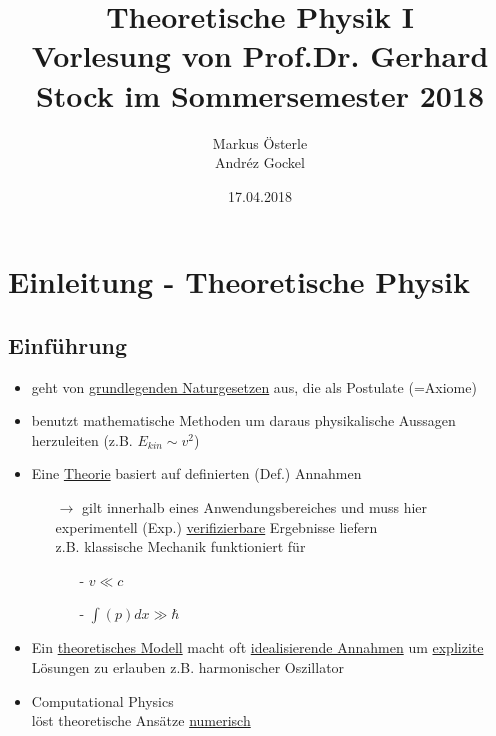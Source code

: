 \documentclass[titlepage,12pt,a4paper,ngerman]{report}
\begin{document}
\title{
\Huge Theoretische Physik I \\[1em]
\Large Vorlesung von Prof.Dr. Gerhard Stock im Sommersemester 2018}
\author{Markus Österle \\ Andréz Gockel}
\date{17.04.2018}
\maketitle
\tableofcontents

\chapter*{Einleitung - Theoretische Physik}

\section*{Einführung}
\begin{itemize}
\item geht von \underline{grundlegenden Naturgesetzen} aus, die als Postulate (=Axiome)
\item benutzt mathematische Methoden um daraus physikalische Aussagen herzuleiten (z.B. $E_{kin}\sim v^2$) 
\item Eine \underline{Theorie} basiert auf definierten (Def.) Annahmen
\begin{itemize}
	\item[$\rightarrow$] gilt innerhalb eines Anwendungsbereiches und muss hier experimentell (Exp.) \underline{verifizierbare} Ergebnisse liefern\\
	z.B. klassische Mechanik funktioniert für
	\begin{itemize}
		\item[-] $v\ll c$
		\item[-] $\int(p)dx \gg \hbar$
	\end{itemize}
\end{itemize}
\item Ein \underline{theoretisches Modell} macht oft \underline{idealisierende Annahmen} um \underline{explizite} Lösungen zu erlauben z.B. harmonischer Oszillator
\item Computational Physics\\
löst theoretische Ansätze \underline{numerisch}
\end{itemize}
\end{document}
